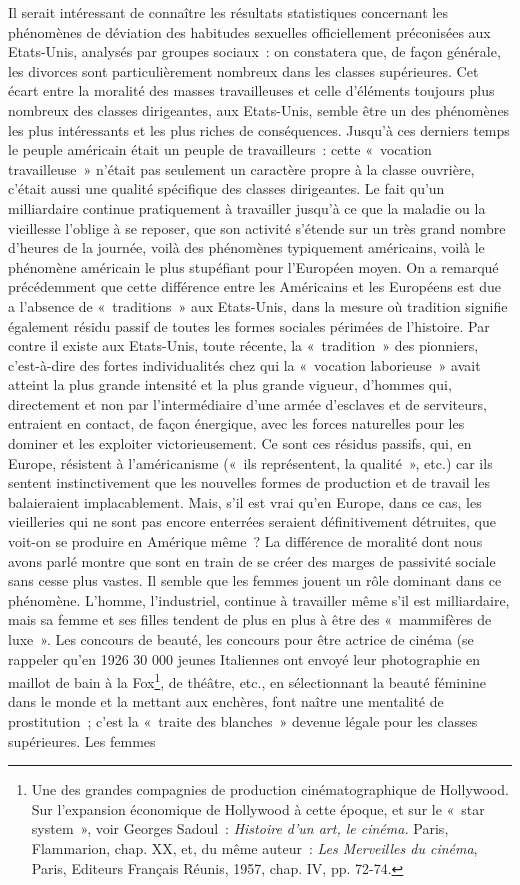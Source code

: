 \documentclass[french,twoside]{book} %
\begin{document}
Il serait intéressant de connaître les résultats statistiques concernant les phénomènes de déviation des habitudes sexuelles officiellement préconisées aux Etats-Unis, analysés par groupes sociaux : on constatera que, de façon générale, les divorces sont particulièrement nombreux dans les classes supérieures. Cet écart entre la moralité des masses travailleuses et celle d’éléments toujours plus nombreux des classes dirigeantes, aux Etats-Unis, semble être un des phénomènes les plus intéressants et les plus riches de conséquences. Jusqu’à ces derniers temps le peuple américain était un peuple de travailleurs : cette « vocation travailleuse » n’était pas seulement un caractère propre à la classe ouvrière, c’était aussi une qualité spécifique des classes dirigeantes. Le fait qu’un milliardaire continue pratiquement à travailler jusqu’à ce que la maladie ou la vieillesse l’oblige à se reposer, que son activité s’étende sur un très grand nombre d’heures de la journée, voilà des phénomènes typiquement américains, voilà le phénomène américain le plus stupéfiant pour l’Européen moyen. On a remarqué précédemment que cette différence entre les Américains et les Européens est due a l’absence de « traditions » aux Etats-Unis, dans la mesure où tradition signifie également résidu passif de toutes les formes sociales périmées de l’histoire. Par contre il existe aux Etats-Unis, toute récente, la « tradition » des pionniers, c’est-à-dire des fortes individualités chez qui la « vocation laborieuse » avait atteint la plus grande intensité et la plus grande vigueur, d’hommes qui, directement et non par l’intermédiaire d’une armée d’esclaves et de serviteurs, entraient en contact, de façon énergique, avec les forces naturelles pour les dominer et les exploiter victorieusement. Ce sont ces résidus passifs, qui, en Europe, résistent à l’américanisme (« ils représentent, la qualité », etc.) car ils sentent instinctivement que les nouvelles formes de production et de travail les balaieraient implacablement. Mais, s’il est vrai qu’en Europe, dans ce cas, les vieilleries qui ne sont pas encore enterrées seraient définitivement détruites, que voit-on se produire en Amérique même ? La différence de moralité dont nous avons parlé montre que sont en train de se créer des marges de passivité sociale sans cesse plus vastes. Il semble que les femmes jouent un rôle dominant dans ce phénomène. L'homme, l’industriel, continue à travailler même s’il est milliardaire, mais sa femme et ses filles tendent de plus en plus à être des « mammifères de luxe ». Les concours de beauté, les concours pour être actrice de cinéma (se rappeler qu’en 1926 30 000 jeunes Italiennes ont envoyé leur photographie en maillot de bain à la Fox\footnote{Une des grandes compagnies de production cinématographique de Hollywood. Sur l’expansion économique de Hollywood à cette époque, et sur le « star system », voir Georges Sadoul : \emph{Histoire d’un art, le cinéma.} Paris, Flammarion, chap. XX, et, du même auteur : \emph{Les Merveilles du cinéma}, Paris, Editeurs Français Réunis, 1957, chap. IV, pp. 72-74.}, de théâtre, etc., en sélectionnant la beauté féminine dans le monde et la mettant aux enchères, font naître une mentalité de prostitution ; c’est la « traite des blanches » devenue légale pour les classes supérieures. Les femmes 
\end{document}
